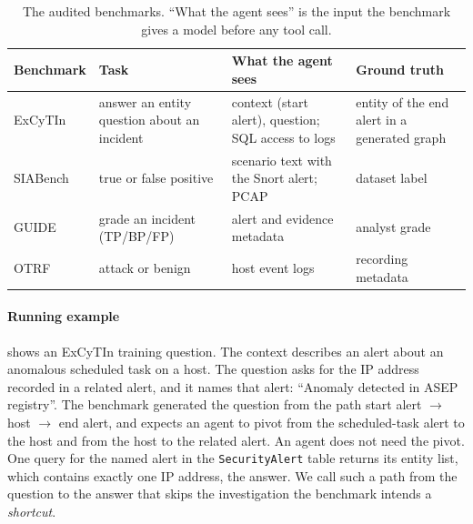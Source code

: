 \begin{table}[t]
  \caption{The audited benchmarks. ``What the agent sees'' is the input the benchmark gives a model before any tool call.}
  \label{tab:benchsetup}
  \centering\footnotesize
  \begin{tabular}{@{}>{\raggedright\arraybackslash}p{1.25cm}>{\raggedright\arraybackslash}p{1.75cm}>{\raggedright\arraybackslash}p{2.2cm}>{\raggedright\arraybackslash}p{1.75cm}@{}}
    \toprule
    Benchmark & Task & What the agent sees & Ground truth \\
    \midrule
    ExCyTIn & answer an entity question about an incident & context (start alert), question; SQL access to logs & entity of the end alert in a generated graph \\
    SIABench & true or false positive & scenario text with the Snort alert; PCAP & dataset label \\
    GUIDE & grade an incident (TP/BP/FP) & alert and evidence metadata & analyst grade \\
    OTRF & attack or benign & host event logs & recording metadata \\
    \bottomrule
  \end{tabular}
\end{table}

\paragraph{Running example}  shows an ExCyTIn training question. The context describes an alert about an anomalous scheduled task on a host. The question asks for the IP address recorded in a related alert, and it names that alert: ``Anomaly detected in ASEP registry''. The benchmark generated the question from the path start alert $\rightarrow$ host $\rightarrow$ end alert, and expects an agent to pivot from the scheduled-task alert to the host and from the host to the related alert. An agent does not need the pivot. One query for the named alert in the \texttt{SecurityAlert} table returns its entity list, which contains exactly one IP address, the answer. We call such a path from the question to the answer that skips the investigation the benchmark intends a \emph{shortcut}.

